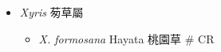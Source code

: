 
  \begin{itemize}
 \item[] \textit{Xyris} 茐草屬
                                
  \begin{itemize}
        \item[] \textit{X. formosana} Hayata  桃園草  \# CR
  \end{itemize}
  \end{itemize}
